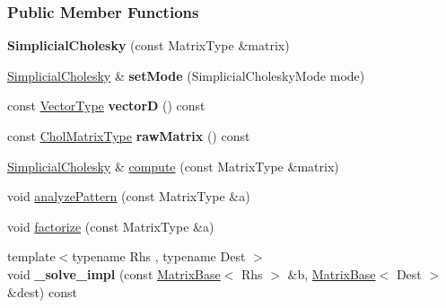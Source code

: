 \subsubsection*{Public Member Functions}
\begin{DoxyCompactItemize}
\item 
\mbox{\label{group___sparse_cholesky___module_a334b3ee515c49a9930bb7f0785cb4fc2}} 
{\bfseries Simplicial\+Cholesky} (const Matrix\+Type \&matrix)
\item 
\mbox{\label{group___sparse_cholesky___module_a25e1d2336ca9c7ae5b3a723bea67ab42}} 
\hyperlink{group___sparse_cholesky___module_class_eigen_1_1_simplicial_cholesky}{Simplicial\+Cholesky} \& {\bfseries set\+Mode} (Simplicial\+Cholesky\+Mode mode)
\item 
\mbox{\label{group___sparse_cholesky___module_ae843051eff656868e8dc878ba6489603}} 
const \hyperlink{group___core___module}{Vector\+Type} {\bfseries vectorD} () const
\item 
\mbox{\label{group___sparse_cholesky___module_a9b1509da967218cf463ae8793445868d}} 
const \hyperlink{group___sparse_core___module}{Chol\+Matrix\+Type} {\bfseries raw\+Matrix} () const
\item 
\hyperlink{group___sparse_cholesky___module_class_eigen_1_1_simplicial_cholesky}{Simplicial\+Cholesky} \& \hyperlink{group___sparse_cholesky___module_a7883b49a88b26162ba6d8b044e2ee75b}{compute} (const Matrix\+Type \&matrix)
\item 
void \hyperlink{group___sparse_cholesky___module_a6af3f64b855a96a2635302f863b5fd91}{analyze\+Pattern} (const Matrix\+Type \&a)
\item 
void \hyperlink{group___sparse_cholesky___module_ab1b21d430cc2a8e332221313a4f2f2e3}{factorize} (const Matrix\+Type \&a)
\item 
\mbox{\label{group___sparse_cholesky___module_a268f4331cd8976ec6f106a34b97bba23}} 
{\footnotesize template$<$typename Rhs , typename Dest $>$ }\\void {\bfseries \+\_\+solve\+\_\+impl} (const \hyperlink{group___core___module_class_eigen_1_1_matrix_base}{Matrix\+Base}$<$ Rhs $>$ \&b, \hyperlink{group___core___module_class_eigen_1_1_matrix_base}{Matrix\+Base}$<$ Dest $>$ \&dest) const

\end{DoxyCompactItemize}
